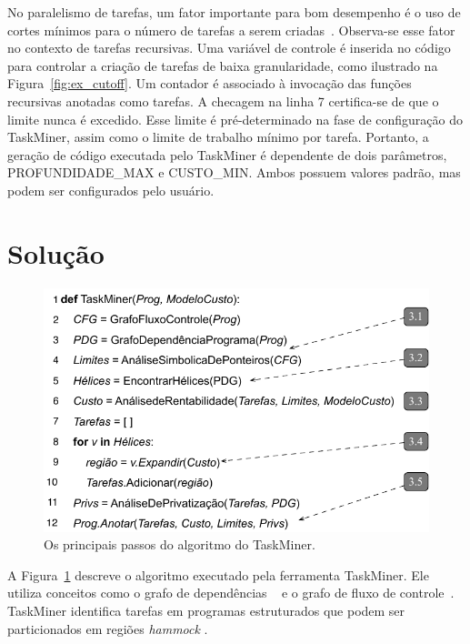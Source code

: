 \documentclass[sigplan,10pt]{acmart}
\newcommand\Taskminer{\mbox{\textsf{TaskMiner}}}
\begin{document}
No paralelismo de tarefas, um fator importante para bom desempenho
é o uso de cortes mínimos para o número de tarefas a serem criadas~\cite{Duran08b}. 
Observa-se esse fator no contexto de tarefas recursivas. 
Uma variável de controle é inserida no código para controlar
a criação de tarefas de baixa granularidade, como ilustrado na Figura~\ref{fig:ex_cutoff}. 
Um contador é associado à invocação das funções recursivas anotadas como tarefas. 
A checagem na linha 7 certifica-se de que o limite
nunca é excedido. Esse limite é pré-determinado na fase de configuração do 
{\Taskminer}, assim como o limite de trabalho mínimo
por tarefa. Portanto, a geração 
de código executada pelo {\Taskminer} é dependente de dois parâmetros,
\textsf{PROFUNDIDADE\_MAX} e \textsf{CUSTO\_MIN}. 
Ambos possuem valores padrão, mas podem ser configurados pelo usuário.	

\section{Solu\c{c}\~{a}o}
\label{sec:sol}

\begin{figure}[b]
\begin{center}
\includegraphics[width=1\columnwidth]{images/alg_main}
\caption{Os principais passos do algoritmo do TaskMiner.}
\label{fig:alg_main}
\end{center}
\end{figure}

A Figura~\ref{fig:alg_main} descreve o algoritmo executado pela ferramenta {\Taskminer}. 
Ele utiliza conceitos  como
o grafo de dependências ~\cite{Ferrante87} e o 
grafo de fluxo de controle~\cite{Kildall73}. {\Taskminer}
identifica tarefas em programas estruturados que podem
ser particionados em regiões \textit{hammock}
\cite{Ferrante87}.
\end{document}
